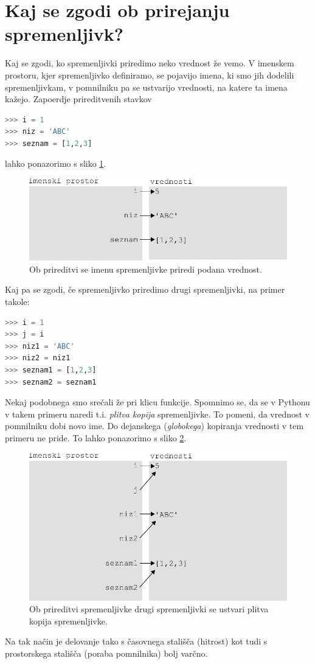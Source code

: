 \section{Kaj se zgodi ob prirejanju spremenljivk?}
Kaj se zgodi, ko spremenljivki priredimo neko vrednost že vemo. V imenskem prostoru, kjer spremenljivko definiramo, se pojavijo imena, ki smo jih dodelili spremenljivkam, v pomnilniku pa se ustvarijo vrednosti, na katere ta imena kažejo. Zapoerdje prireditvenih stavkov
\begin{lstlisting}[language=Python]
>>> i = 1
>>> niz = 'ABC'
>>> seznam = [1,2,3]
\end{lstlisting}
lahko ponazorimo s sliko \ref{img:spremenljivost}.
\begin{figure}
    \centering
    \includegraphics[width=\linewidth]{img/spremenljivost.pdf}
    \caption{Ob prireditvi se imenu spremenljivke priredi podana vrednost.}
    \label{img:spremenljivost}
\end{figure}
Kaj pa se zgodi, če spremenljivko priredimo drugi spremenljivki, na primer takole:
\begin{lstlisting}[language=Python]
>>> i = 1
>>> j = i
>>> niz1 = 'ABC'
>>> niz2 = niz1
>>> seznam1 = [1,2,3]
>>> seznam2 = seznam1
\end{lstlisting}
Nekaj podobnega smo srečali že pri klicu funkcije. Spomnimo se, da se v Pythonu v takem primeru naredi t.i. \textit{plitva kopija} spremenljivke. To pomeni, da vrednost v pomnilniku dobi novo ime. Do dejanskega (\textit{globokega}) kopiranja vrednosti v tem primeru ne pride. To lahko ponazorimo s sliko \ref{img:spremenljivost_2}.
\begin{figure}
    \centering
    \includegraphics[width=\linewidth]{img/spremenljivost_2.pdf}
    \caption{Ob prireditvi spremenljivke drugi spremenljivki se ustvari plitva kopija spremenljivke.}
    \label{img:spremenljivost_2}
\end{figure}
Na tak način je delovanje tako s časovnega stališča (hitrost) kot tudi s prostorskega stališča (poraba pomnilnika) bolj varčno. 

